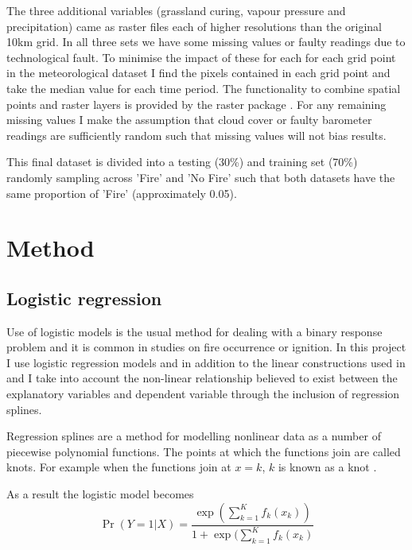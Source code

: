 \documentclass[11pt,a4paper]{article}
\begin{document}
The three additional variables (grassland curing, vapour pressure and precipitation) came as raster files each of higher resolutions than the original 10km grid. In all three sets we have some missing values or faulty readings due to technological fault. To minimise the impact of these for each for each grid point in the meteorological dataset I find the pixels contained in each grid point and take the median value for each time period. The functionality to combine spatial points and raster layers is provided by the raster package \citep{raster}. For any remaining missing values I make the assumption that cloud cover or faulty barometer readings are sufficiently random such that missing values will not bias results.
 

This final dataset is divided into a testing (30\%) and training set (70\%) randomly sampling across 'Fire' and 'No Fire' such that both datasets have the same proportion of 'Fire' (approximately 0.05). 

\section{Method}

\subsection{Logistic regression}

Use of logistic models is the usual method for dealing with a binary response problem and it is common in studies on fire occurrence or ignition.  In this project I use logistic regression models and in addition to the linear constructions used in \citet{andrews03} and \citet{del11} I take into account the non-linear relationship believed to exist between the explanatory variables and dependent variable through the inclusion of regression splines. 

Regression splines are a method for modelling nonlinear data as a number of piecewise  polynomial functions. The points at which the functions join are called knots. For example when the functions join at $x=k$, $k$ is known as a knot \citep{ruppert03}.

As a result the logistic model becomes
\begin{equation}
\label{eq logits}
\Pr(Y=1|X)=\frac{\exp(\sum_{k=1}^K f_k(x_k))}{1+\exp(\sum_{k=1}^K f_k(x_k)}
\end{equation}
\end{document}
